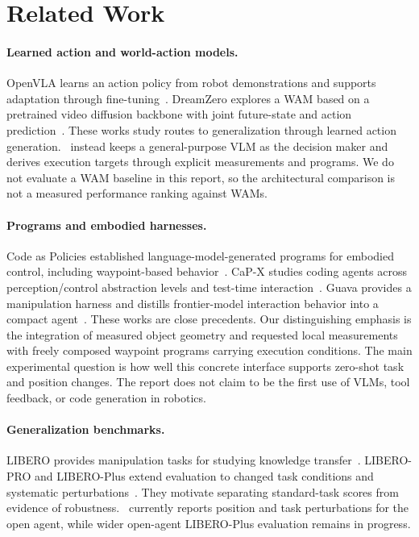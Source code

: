 \section{Related Work}

\paragraph{Learned action and world-action models.}
OpenVLA learns an action policy from robot demonstrations and supports adaptation through fine-tuning~\citep{kim2024openvla}. DreamZero explores a WAM based on a pretrained video diffusion backbone with joint future-state and action prediction~\citep{ye2026dreamzero}. These works study routes to generalization through learned action generation. \zyra\ instead keeps a general-purpose VLM as the decision maker and derives execution targets through explicit measurements and programs. We do not evaluate a WAM baseline in this report, so the architectural comparison is not a measured performance ranking against WAMs.

\paragraph{Programs and embodied harnesses.}
Code as Policies established language-model-generated programs for embodied control, including waypoint-based behavior~\citep{liang2022code}. CaP-X studies coding agents across perception/control abstraction levels and test-time interaction~\citep{fu2026capx}. Guava provides a manipulation harness and distills frontier-model interaction behavior into a compact agent~\citep{liu2026guava}. These works are close precedents. Our distinguishing emphasis is the integration of measured object geometry and requested local measurements with freely composed waypoint programs carrying execution conditions. The main experimental question is how well this concrete interface supports zero-shot task and position changes. The report does not claim to be the first use of VLMs, tool feedback, or code generation in robotics.

\paragraph{Generalization benchmarks.}
LIBERO provides manipulation tasks for studying knowledge transfer~\citep{liu2023libero}. LIBERO-PRO and LIBERO-Plus extend evaluation to changed task conditions and systematic perturbations~\citep{zhou2025liberopro,fei2025liberoplus}. They motivate separating standard-task scores from evidence of robustness. \zyra\ currently reports position and task perturbations for the open agent, while wider open-agent LIBERO-Plus evaluation remains in progress.
